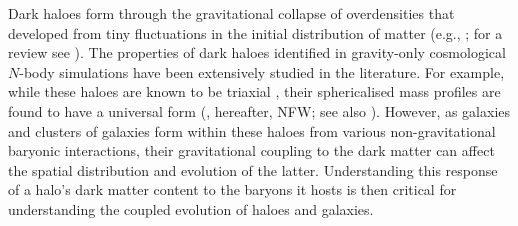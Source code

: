 Dark haloes form through the gravitational collapse of overdensities that developed from tiny fluctuations in the initial distribution of matter (e.g., \citealp[][]{1974ApJ...187..425P}; for a review see \citealp{2002PhR...372....1C}). 
The properties of dark haloes identified in gravity-only cosmological $N$-body simulations have been extensively studied in the literature. For example, while these haloes are known to be triaxial \citep[][]{1988ApJ...327..507F}, their sphericalised mass profiles are found to have a universal form (\citealp{1996ApJ...462..563N,1997ApJ...490..493N}, hereafter, NFW; see also \citealp{2010MNRAS.402...21N}). 
However, as galaxies and clusters of galaxies form within these haloes from various non-gravitational baryonic interactions, their gravitational coupling to the dark matter can affect the spatial distribution and evolution of the latter. Understanding this response of a halo's dark matter content to the baryons it hosts is then critical for understanding the coupled evolution of haloes and galaxies. 


